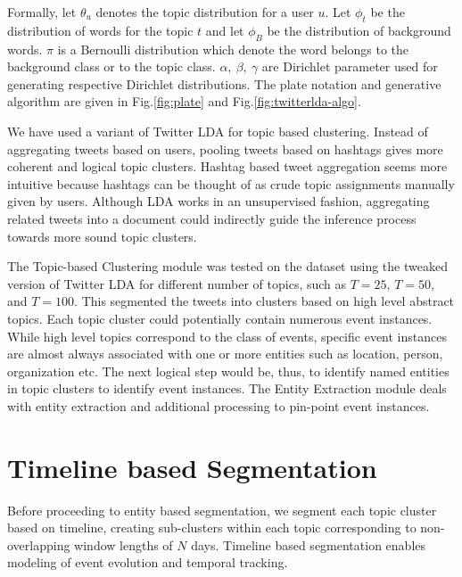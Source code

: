 Formally, let $\theta_u$ denotes the topic distribution for a user $u$. Let $\phi_t$ be the distribution of words for the topic $t$ and let $\phi_B$ be the distribution of background words. $\pi$ is a Bernoulli distribution which denote the word belongs to the background class or to the topic class. $\alpha,~\beta,~\gamma$ are Dirichlet parameter used for generating respective Dirichlet distributions. The plate notation and generative algorithm are given in Fig.\ref{fig:plate} and Fig.\ref{fig:twitterlda-algo}.

We have used a variant of Twitter LDA for topic based clustering. Instead of aggregating tweets based on users, pooling tweets based on hashtags gives more coherent and logical topic clusters. Hashtag based tweet aggregation seems more intuitive because hashtags can be thought of as crude topic assignments manually given by users. Although LDA works in an unsupervised fashion, aggregating related tweets into a document could indirectly guide the inference process towards more sound topic clusters.

The Topic-based Clustering module was tested on the dataset using the tweaked version of Twitter LDA for different number of topics, such as $T=25$, $T=50$, and $T=100$. This segmented the tweets into clusters based on high level abstract topics. Each topic cluster could potentially contain numerous event instances. While high level topics correspond to the class of events, specific event instances are almost always associated with one or more entities such as location, person, organization etc. The next logical step would be, thus, to identify named entities in topic clusters to identify event instances. The Entity Extraction module deals with entity extraction and additional processing to pin-point event instances.

\section{Timeline based Segmentation}
Before proceeding to entity based segmentation, we segment each topic cluster based on timeline, creating sub-clusters within each topic corresponding to non-overlapping window lengths of $N$ days. Timeline based segmentation enables modeling of event evolution and temporal tracking.

